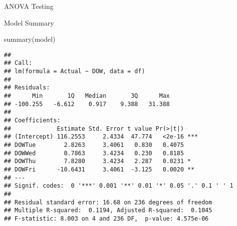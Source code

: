 \documentclass[
  ignorenonframetext,
]{beamer}
\newenvironment{Shaded}{\begin{snugshade}}{\end{snugshade}}
\newcommand{\FunctionTok}[1]{\textcolor[rgb]{0.00,0.00,0.00}{#1}}
\newcommand{\NormalTok}[1]{#1}
\begin{document}
\begin{frame}[fragile]{ANOVA Testing}
\begin{block}{Model Summary}
\protect\hypertarget{model-summary}{}
\begin{Shaded}
\begin{Highlighting}[]
\FunctionTok{summary}\NormalTok{(model)}
\end{Highlighting}
\end{Shaded}

\begin{verbatim}
## 
## Call:
## lm(formula = Actual ~ DOW, data = df)
## 
## Residuals:
##      Min       1Q   Median       3Q      Max 
## -100.255   -6.612    0.917    9.388   31.388 
## 
## Coefficients:
##             Estimate Std. Error t value Pr(>|t|)    
## (Intercept) 116.2553     2.4334  47.774   <2e-16 ***
## DOWTue        2.8263     3.4061   0.830   0.4075    
## DOWWed        0.7863     3.4234   0.230   0.8185    
## DOWThu        7.8280     3.4234   2.287   0.0231 *  
## DOWFri      -10.6431     3.4061  -3.125   0.0020 ** 
## ---
## Signif. codes:  0 '***' 0.001 '**' 0.01 '*' 0.05 '.' 0.1 ' ' 1
## 
## Residual standard error: 16.68 on 236 degrees of freedom
## Multiple R-squared:  0.1194, Adjusted R-squared:  0.1045 
## F-statistic: 8.003 on 4 and 236 DF,  p-value: 4.575e-06
\end{verbatim}
\end{block}
\end{frame}
\end{document}
